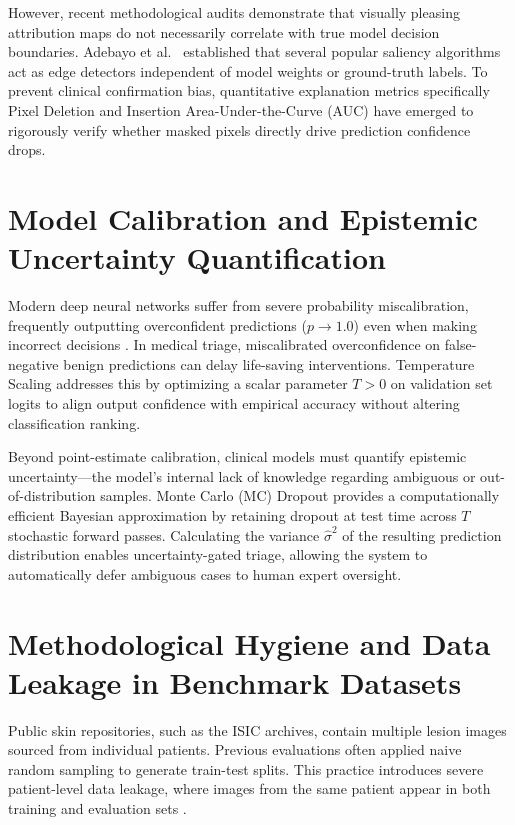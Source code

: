 \documentclass[12pt,a4paper]{report}
\begin{document}
	However, recent methodological audits demonstrate that visually pleasing attribution maps do not necessarily correlate with true model decision boundaries. Adebayo et al.\ \cite{adebayo2018sanity} established that several popular saliency algorithms act as edge detectors independent of model weights or ground-truth labels. To prevent clinical confirmation bias, quantitative explanation metrics specifically Pixel Deletion and Insertion Area-Under-the-Curve (AUC) \cite{petsiuk2018rise} have emerged to rigorously verify whether masked pixels directly drive prediction confidence drops.
	
	\section{Model Calibration and Epistemic Uncertainty Quantification}
	Modern deep neural networks suffer from severe probability miscalibration, frequently outputting overconfident predictions ($p \to 1.0$) even when making incorrect decisions \cite{guo2017calibration}. In medical triage, miscalibrated overconfidence on false-negative benign predictions can delay life-saving interventions. Temperature Scaling \cite{guo2017calibration} addresses this by optimizing a scalar parameter $T>0$ on validation set logits to align output confidence with empirical accuracy without altering classification ranking.
	
	Beyond point-estimate calibration, clinical models must quantify epistemic uncertainty—the model's internal lack of knowledge regarding ambiguous or out-of-distribution samples. Monte Carlo (MC) Dropout \cite{gal2016dropout} provides a computationally efficient Bayesian approximation by retaining dropout at test time across $T$ stochastic forward passes. Calculating the variance $\hat{\sigma}^2$ of the resulting prediction distribution enables uncertainty-gated triage, allowing the system to automatically defer ambiguous cases to human expert oversight.
	
	\section{Methodological Hygiene and Data Leakage in Benchmark Datasets}
	Public skin repositories, such as the ISIC archives, contain multiple lesion images sourced from individual patients. Previous evaluations often applied naive random sampling to generate train-test splits. This practice introduces severe patient-level data leakage, where images from the same patient appear in both training and evaluation sets \cite{bisla2019towards}.
	
\end{document}
